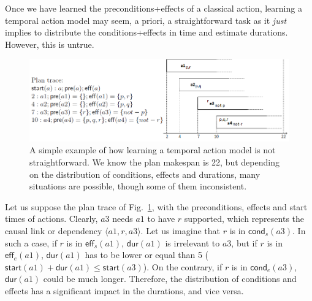 \documentclass[runningheads]{llncs}
\newcommand{\tup}[1]{{\langle #1 \rangle}}
\newcommand{\pre}{\mathsf{pre}}    %
\newcommand{\eff}{\mathsf{eff}}    %
\newcommand{\cond}{\mathsf{cond}}  %
\newcommand{\dur}{\mathsf{dur}}    %
\newcommand{\start}{\mathsf{start}}%
\begin{document}

Once we have learned the preconditions+effects of a classical action, learning a temporal action model may seem, a priori, a straightforward task as it \emph{just} implies to distribute the conditions+effects in time and estimate durations. However, this is untrue.

\begin{figure}


\center \includegraphics[width=12cm]{ejemploacciones2.png}
\caption{A simple example of how learning a temporal action model is not straightforward. We know the plan makespan is 22, but depending on the distribution of conditions, effects and durations, many situations are possible, though some of them inconsistent.}
\label{fig:exampleplantrace}
\end{figure}


Let us suppose the plan trace of Fig.~\ref{fig:exampleplantrace}, with the preconditions, effects and start times of actions. Clearly, $a3$ needs $a1$ to have $r$ supported, which represents the causal link or dependency $\tup{a1,r,a3}$. Let us imagine that $r$ is in $\cond_s(a3)$. In such a case, if $r$ is in $\eff_s(a1)$, $\dur(a1)$ is irrelevant to $a3$, but if $r$ is in $\eff_e(a1)$, $\dur(a1)$ has to be lower or equal than 5 ($\start(a1)+\dur(a1) \leq \start(a3)$). On the contrary, if $r$ is in $\cond_e(a3)$, $\dur(a1)$ could be much longer. Therefore, the distribution of conditions and effects has a significant impact in the durations, and vice versa.
\end{document}
